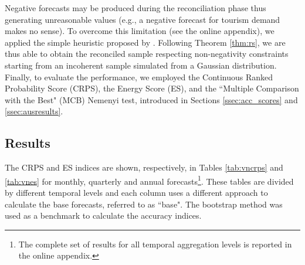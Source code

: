 \documentclass[12pt]{article}
\theoremstyle{definition}
\begin{document}
Negative forecasts may be produced during the reconciliation phase \citep{wickramasuriya2020, difonzo2022a, difonzo2023a} thus generating unreasonable values (e.g., a negative forecast for tourism demand makes no sense). To overcome this limitation (see the online appendix), we applied the simple heuristic proposed by \cite{difonzo2022b, difonzo2023a}. Following Theorem \ref{thm:rs}, we are thus able to obtain the reconciled sample respecting non-negativity constraints starting from an incoherent sample simulated from a Gaussian distribution. Finally, to evaluate the performance, we employed the Continuous Ranked Probability Score (CRPS), the Energy Score (ES), and the “Multiple Comparison with the Best" (MCB) Nemenyi test, introduced in Sections \ref{ssec:acc_scores} and \ref{ssec:ausresults}. 

\subsection{Results}

The CRPS and ES indices are shown, respectively, in Tables \ref{tab:vncrps} and \ref{tab:vnes} for monthly, quarterly and annual forecasts\footnote{The complete set of results for all temporal aggregation levels is reported in the online appendix.}. These tables are divided by different temporal levels and each column uses a different approach to calculate the base forecasts, referred to as “base". The bootstrap method was used as a benchmark to calculate the accuracy indices.

\begin{table}[!tb]
	\centering
	\begingroup
	\fontsize{9}{10}\selectfont
	
	\endgroup
	\caption{AvgRelCRPS defined in \eqref{eq:skill} and \eqref{eq:skillCRPS_all} for the Australian Tourism Demand dataset. %
	Approaches performing worse than the benchmark (bootstrap base forecasts, ctjb) are highlighted in red, the best for each column is marked in bold, and the overall lowest value is highlighted in blue. The reconciliation approaches are described in \autoref{tab:notation}.}
	\label{tab:vncrps}
\end{table}

\begin{table}[!tb]
	\centering
	\begingroup
	\fontsize{9}{10}\selectfont
	
	\endgroup
	\caption{ES ratio indices defined in \eqref{eq:skill} and \eqref{eq:skillES_all} for the Australian Tourism Demand dataset. %
	Approaches performing worse than the benchmark (bootstrap base forecasts, ctjb) are highlighted in red, the best for each column is marked in bold, and the overall lowest value is highlighted in blue. The reconciliation approaches are described in \autoref{tab:notation}.}
	\label{tab:vnes}
\end{table}
\end{document}
